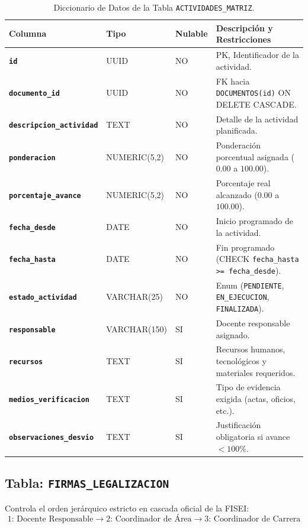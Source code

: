 \documentclass[12pt,a4paper]{article}
\begin{document}
\begin{table}[htbp]
\centering
\small
\begin{tabularx}{\textwidth}{|>{\hsize=0.7\hsize\bfseries}X|>{\hsize=0.55\hsize}X|>{\hsize=0.3\hsize\centering\arraybackslash}X|>{\hsize=1.45\hsize}X|}
    \hline
    \rowcolor{tableheader}
    Columna & Tipo & Nulable & Descripción y Restricciones \\
    \hline
    \texttt{id} & UUID & NO & PK, Identificador de la actividad. \\
    \hline
    \texttt{documento\_id} & UUID & NO & FK hacia \texttt{DOCUMENTOS(id)} ON DELETE CASCADE. \\
    \hline
    \texttt{descripcion\_actividad} & TEXT & NO & Detalle de la actividad planificada. \\
    \hline
    \texttt{ponderacion} & NUMERIC(5,2) & NO & Ponderación porcentual asignada ($0.00$ a $100.00$). \\
    \hline
    \texttt{porcentaje\_avance} & NUMERIC(5,2) & NO & Porcentaje real alcanzado ($0.00$ a $100.00$). \\
    \hline
    \texttt{fecha\_desde} & DATE & NO & Inicio programado de la actividad. \\
    \hline
    \texttt{fecha\_hasta} & DATE & NO & Fin programado (CHECK \texttt{fecha\_hasta >= fecha\_desde}). \\
    \hline
    \texttt{estado\_actividad} & VARCHAR(25) & NO & Enum (\texttt{PENDIENTE}, \texttt{EN\_EJECUCION}, \texttt{FINALIZADA}). \\
    \hline
    \texttt{responsable} & VARCHAR(150) & SI & Docente responsable asignado. \\
    \hline
    \texttt{recursos} & TEXT & SI & Recursos humanos, tecnológicos y materiales requeridos. \\
    \hline
    \texttt{medios\_verificacion} & TEXT & SI & Tipo de evidencia exigida (actas, oficios, etc.). \\
    \hline
    \texttt{observaciones\_desvio} & TEXT & SI & Justificación obligatoria si avance $< 100\%$. \\
    \hline
\end{tabularx}
\caption{Diccionario de Datos de la Tabla \texttt{ACTIVIDADES\_MATRIZ}.}
\label{tab:s2_04_act}
\end{table}

\subsection{Tabla: \texttt{FIRMAS\_LEGALIZACION}}
Controla el orden jerárquico estricto en cascada oficial de la FISEI:
\[
\text{1: Docente Responsable} \longrightarrow \text{2: Coordinador de Área} \longrightarrow \text{3: Coordinador de Carrera}
\]
\end{document}
